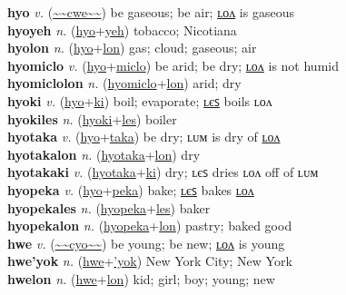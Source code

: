 \textbf{hyo} \textit{v.} (\hyperref[cwe]{\~{}\~{}cwe\~{}\~{}})
be gaseous; be air; \hyperref[hyolon]{ʟᴏᴧ} is gaseous \label{hyo} \\
\textbf{hyoyeh} \textit{n.} (\hyperref[hyo]{hyo}+\hyperref[yeh]{yeh})
tobacco; Nicotiana \label{hyoyeh} \\
\textbf{hyolon} \textit{n.} (\hyperref[hyo]{hyo}+\hyperref[lon]{lon})
gas; cloud; gaseous; air \label{hyolon} \\
\textbf{hyomiclo} \textit{v.} (\hyperref[hyo]{hyo}+\hyperref[miclo]{miclo})
be arid; be dry; \hyperref[hyomiclolon]{ʟᴏᴧ} is not humid \label{hyomiclo} \\
\textbf{hyomiclolon} \textit{n.} (\hyperref[hyomiclo]{hyomiclo}+\hyperref[lon]{lon})
arid; dry \label{hyomiclolon} \\
\textbf{hyoki} \textit{v.} (\hyperref[hyo]{hyo}+\hyperref[ki]{ki})
boil; evaporate; \hyperref[hyokiles]{ʟєꜱ} boils ʟᴏᴧ \label{hyoki} \\
\textbf{hyokiles} \textit{n.} (\hyperref[hyoki]{hyoki}+\hyperref[les]{les})
boiler \label{hyokiles} \\
\textbf{hyotaka} \textit{v.} (\hyperref[hyo]{hyo}+\hyperref[taka]{taka})
be dry; ʟᴜᴍ is dry of \hyperref[hyotakalon]{ʟᴏᴧ} \label{hyotaka} \\
\textbf{hyotakalon} \textit{n.} (\hyperref[hyotaka]{hyotaka}+\hyperref[lon]{lon})
dry \label{hyotakalon} \\
\textbf{hyotakaki} \textit{v.} (\hyperref[hyotaka]{hyotaka}+\hyperref[ki]{ki})
dry; ʟєꜱ dries ʟᴏᴧ off of ʟᴜᴍ \label{hyotakaki} \\
\textbf{hyopeka} \textit{v.} (\hyperref[hyo]{hyo}+\hyperref[peka]{peka})
bake; \hyperref[hyopekales]{ʟєꜱ} bakes \hyperref[hyopekalon]{ʟᴏᴧ} \label{hyopeka} \\
\textbf{hyopekales} \textit{n.} (\hyperref[hyopeka]{hyopeka}+\hyperref[les]{les})
baker \label{hyopekales} \\
\textbf{hyopekalon} \textit{n.} (\hyperref[hyopeka]{hyopeka}+\hyperref[lon]{lon})
pastry; baked good \label{hyopekalon} \\
\textbf{hwe} \textit{v.} (\hyperref[cyo]{\~{}\~{}cyo\~{}\~{}})
be young; be new; \hyperref[hwelon]{ʟᴏᴧ} is young \label{hwe} \\
\textbf{hwe'yok} \textit{n.} (\hyperref[hwe]{hwe}+\hyperref['yok]{'yok})
New York City; New York \label{hwe'yok} \\
\textbf{hwelon} \textit{n.} (\hyperref[hwe]{hwe}+\hyperref[lon]{lon})
kid; girl; boy; young; new \label{hwelon} \\
